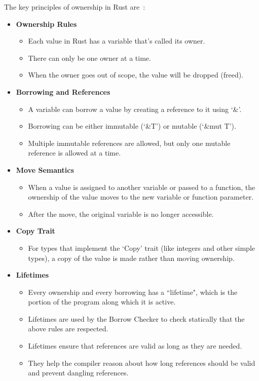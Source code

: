 The key principles of ownership in Rust are~\cite{rust}:
\begin{itemize}
    \item \textbf{Ownership Rules}
    \begin{itemize}
        \item Each value in Rust has a variable that's called its owner.
        \item There can only be one owner at a time.
        \item When the owner goes out of scope, the value will be dropped (freed).
    \end{itemize}
    \item \textbf{Borrowing and References}
    \begin{itemize}
        \item A variable can borrow a value by creating a reference to it using `\&'.
        \item Borrowing can be either immutable (`\&T') or mutable (`\&mut T').
        \item Multiple immutable references are allowed, but only one mutable reference is allowed at a time.
    \end{itemize}
    \item \textbf{Move Semantics}
    \begin{itemize}
        \item When a value is assigned to another variable or passed to a function, the ownership of the value moves to the new variable or function parameter.
        \item After the move, the original variable is no longer accessible.
    \end{itemize}
    \item \textbf{Copy Trait}
    \begin{itemize}
        \item For types that implement the `Copy' trait (like integers and other simple types), a copy of the value is made rather than moving ownership.
    \end{itemize}
    \item \textbf{Lifetimes}
    \begin{itemize}
        \item Every ownership and every borrowing has a ``lifetime", which is the portion of the program along which it is active.
        \item Lifetimes are used by the Borrow Checker to check statically that the above rules are respected.
        \item Lifetimes ensure that references are valid as long as they are needed.
        \item They help the compiler reason about how long references should be valid and prevent dangling references.
    \end{itemize}
\end{itemize}

